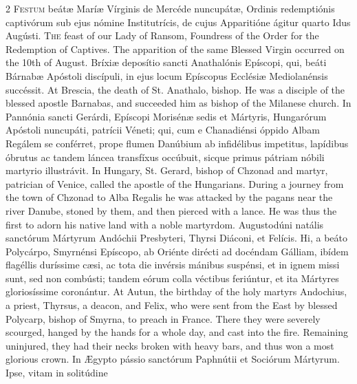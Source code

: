 \begin{paracol}{2}
\lettrine[lines=2]{F}{estum} beátæ Maríæ 
 Vírginis de Mercéde nuncupátæ, Ordinis redemptiónis captivórum sub ejus 
 nómine Institutrícis, de cujus Apparitióne ágitur quarto Idus Augústi.
\switchcolumn
{}
\lettrine[lines=2]{T}{he} feast of our Lady of Ransom, 
 Foundress of the Order for the Redemption of Captives. The apparition 
 of the same Blessed Virgin occurred on the 10th of August.
\switchcolumn*
{}
Bríxiæ deposítio sancti 
 Anathalónis Epíscopi, qui, beáti Bárnabæ Apóstoli discípuli, in ejus locum 
 Epíscopus Ecclésiæ Mediolanénsis succéssit.
\switchcolumn
{}
At Brescia, the death of St. 
 Anathalo, bishop. He was a disciple of the blessed apostle Barnabas, 
 and succeeded him as bishop of the Milanese church.
\switchcolumn*
{}
In Pannónia sancti 
 Gerárdi, Epíscopi Morisénæ sedis et Mártyris, Hungarórum Apóstoli nuncupáti, 
 patrícii Véneti; qui, cum e Chanadiénsi óppido Albam Regálem se conférret, 
 prope flumen Danúbium ab infidélibus impetitus, lapídibus óbrutus ac tandem 
 láncea transfíxus occúbuit, sicque primus pátriam nóbili martyrio 
 illustrávit.
\switchcolumn
{}
In Hungary, St. Gerard, bishop of 
 Chzonad and martyr, patrician of Venice, called the apostle of the 
 Hungarians. During a journey from the town of Chzonad to Alba Regalis 
 he was attacked by the pagans near the river Danube, stoned by them, and 
 then pierced with a lance. He was thus the first to adorn his native 
 land with a noble martyrdom.
\switchcolumn*
{}
Augustodúni natális 
 sanctórum Mártyrum Andóchii Presbyteri, Thyrsi Diáconi, et Felícis. 
 Hi, a beáto Polycárpo, Smyrnénsi Epíscopo, ab Oriénte dirécti ad docéndam 
 Gálliam, ibídem flagéllis duríssime cæsi, ac tota die invérsis mánibus 
 suspénsi, et in ignem missi sunt, sed non combústi; tandem eórum colla 
 véctibus feriúntur, et ita Mártyres gloriosíssime coronántur.
\switchcolumn
{}
At Autun, the birthday of the holy 
 martyrs Andochius, a priest, Thyrsus, a deacon, and Felix, who were sent 
 from the East by blessed Polycarp, bishop of Smyrna, to preach in France. 
 There they were severely scourged, hanged by the hands for a whole day, and 
 cast into the fire. Remaining uninjured, they had their necks broken 
 with heavy bars, and thus won a most glorious crown.
\switchcolumn*
{}
In Ægypto pássio 
 sanctórum Paphnútii et Sociórum Mártyrum. Ipse, vitam in solitúdine 

\end{paracol}
